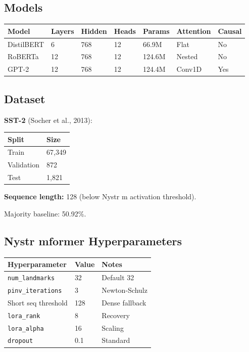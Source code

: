 \subsection{Models}

\begin{table}[H]
\centering
\small
\begin{tabular}{lllllll}
\toprule
\textbf{Model} & \textbf{Layers} & \textbf{Hidden} & \textbf{Heads} & \textbf{Params} & \textbf{Attention} & \textbf{Causal} \\
\midrule
DistilBERT & 6 & 768 & 12 & 66.9M & Flat & No \\
RoBERTa & 12 & 768 & 12 & 124.6M & Nested & No \\
GPT-2 & 12 & 768 & 12 & 124.4M & Conv1D & Yes \\
\bottomrule
\end{tabular}
\end{table}

\subsection{Dataset}

\textbf{SST-2} (Socher et al., 2013):

\begin{table}[H]
\centering
\small
\begin{tabular}{ll}
\toprule
\textbf{Split} & \textbf{Size} \\
\midrule
Train & 67,349 \\
Validation & 872 \\
Test & 1,821 \\
\bottomrule
\end{tabular}
\end{table}

\textbf{Sequence length:} 128 (below Nystr m activation threshold).

Majority baseline: 50.92\%.

\subsection{Nystr mformer Hyperparameters}

\begin{table}[H]
\centering
\small
\begin{tabular}{lll}
\toprule
\textbf{Hyperparameter} & \textbf{Value} & \textbf{Notes} \\
\midrule
\texttt{num\_landmarks} & 32 & Default 32 \\
\texttt{pinv\_iterations} & 3 & Newton-Schulz \\
Short seq threshold & 128 & Dense fallback \\
\texttt{lora\_rank} & 8 & Recovery \\
\texttt{lora\_alpha} & 16 & Scaling \\
\texttt{dropout} & 0.1 & Standard \\
\bottomrule
\end{tabular}
\end{table}


